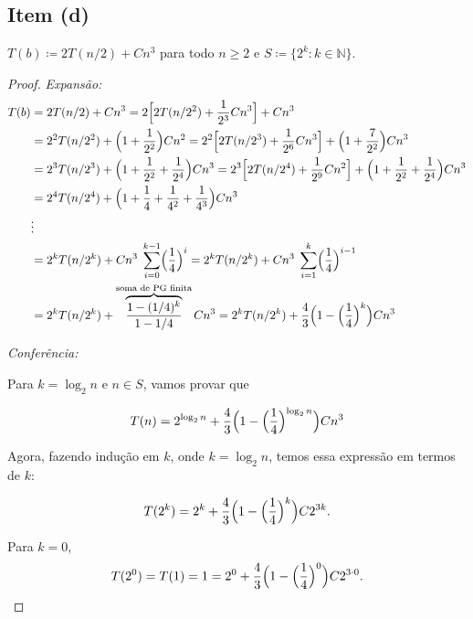 \documentclass{article}
\begin{document}
\newpage

\subsection*{Item (d)}
$T(b) \coloneqq 2 T(n/2) + Cn^3$ para todo $n \geq 2$ e $S \coloneqq \{ 2^k : k \in \mathbb{N} \}$.

\begin{proof}
\textit{Expansão: }
\begin{align*}
  T(b) &= 2 T(n/2) + Cn^3
  = 2 \Bigl[ 2 T(n/2^2) + \frac{1}{2^3} Cn^3 \Bigr] + Cn^3 \\
  &= 2^2 T(n/2^2) + \Bigl(1 + \frac{1}{2^2}\Bigr) Cn^2
  = 2^2 \Bigl[2 T(n/2^3) + \frac{1}{2^6} Cn^3\Bigr] + \Bigl(1 + \frac{7}{2^2}\Bigr) Cn^3 \\
  &= 2^3 T(n/2^3) + \Bigl(1 + \frac{1}{2^2} + \frac{1}{2^4}\Bigr) Cn^3
  = 2^3 \Bigl[2 T(n/2^4) + \frac{1}{2^9} Cn^2 \Bigr] + \Bigl(1 + \frac{1}{2^2} + \frac{1}{2^4}\Bigr) Cn^3 \\
  &= 2^4 T(n/2^4) + \Bigl(1 + \frac{1}{4} + \frac{1}{4^2} + \frac{1}{4^3}\Bigr) Cn^3 \\
  &\vdots \\
  &= 2^k T(n/2^k) + Cn^3 \; \sum_{i=0}^{k-1} \Bigl(\frac{1}{4}\Bigr)^i
  = 2^k T(n/2^k) + Cn^3 \; \sum_{i=1}^{k} \Bigl(\frac{1}{4}\Bigr)^{i-1} \\
  &= 2^k T(n/2^k) + \overbrace{\frac{1 - (1/4)^{k}}{1 - 1/4}}^\text{soma de PG finita} Cn^3
  = 2^k T(n/2^k) + \frac{4}{3} \Bigl(1 - \Bigl(\frac{1}{4}\Bigr)^{k}\Bigr) Cn^3
\end{align*}

\textit{Conferência: }

Para $k = \log_2 n$ e $n \in S$, vamos provar que

\begin{align*}
  T(n) &= 2^{\log_2 n} + \frac{4}{3} \Bigl(1 - \Bigl(\frac{1}{4}\Bigr)^{\log_2 n}\Bigr) Cn^3 \\
\end{align*}

Agora, fazendo indução em $k$, onde $k = \log_2 n$, temos essa expressão em termos de $k$:

\[ T(2^k) = 2^k + \frac{4}{3}\Bigl(1 - \Bigl(\frac{1}{4}\Bigr)^{k}\Bigr) C2^{3k} .\]

Para $k=0$,
\[ T(2^0) = T(1) = 1 = 2^0 + \frac{4}{3} \Bigl(1 - \Bigl(\frac{1}{4}\Bigr)^{0}\Bigr) C2^{3\cdot 0}. \]


\end{proof}
\end{document}
